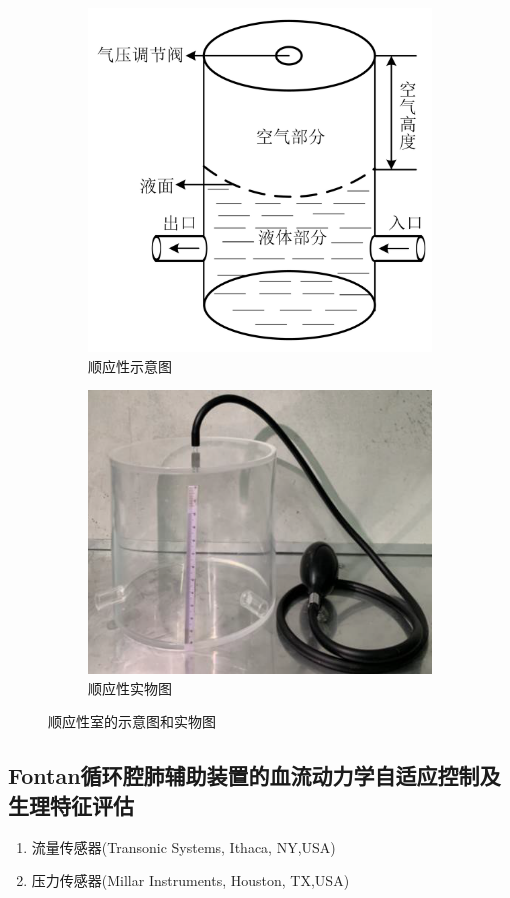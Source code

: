 \documentclass[titlepage,12pt]{article}
\begin{document}
\begin{figure}[htbp]
    \centering
    \begin{subfigure}[b]{0.40\textwidth}
        \centering
        \includegraphics[width=\textwidth]{figures/顺应性示意图.png}
        \caption{顺应性示意图}
        \label{fig:compliance_diagram}
    \end{subfigure}
    \hfill
    \begin{subfigure}[b]{0.45\textwidth}
        \centering
        \includegraphics[width=\textwidth]{figures/顺应性实物图.png}
        \caption{顺应性实物图}
        \label{fig:compliance_real}
    \end{subfigure}
    \caption{顺应性室的示意图和实物图}
\end{figure}


\subsection{Fontan循环腔肺辅助装置的血流动力学自适应控制及生理特征评估}
\begin{enumerate}
    \item 流量传感器(Transonic Systems, Ithaca, NY,USA)
    \item 压力传感器(Millar Instruments, Houston, TX,USA)
\end{enumerate}
\end{document}
